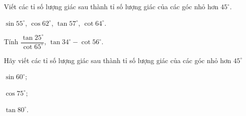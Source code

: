 \begin{bt}
	\begin{listEX}
	\item Viết các tỉ số lượng giác sau thành tỉ số lượng giác của các góc nhỏ hơn $45^\circ$.
	\begin{center} 
	$\sin 55^\circ$, $\cos 62^\circ$, $\tan 57^\circ$, $\cot 64^\circ$.
	\end{center}
	\item Tính $\dfrac{\tan25^\circ}{\cot 65^\circ}$, $\tan 34^\circ - \cot 56^\circ$.
	\end{listEX}
\end{bt}
\begin{bt}
	Hãy viết các tỉ số lượng giác sau thành tỉ số lượng giác của các góc nhỏ hơn $45^\circ$
	\begin{enumEX}{3}
	\item $\sin 60^\circ$;
	\item $\cos 75^\circ$;
	\item $\tan 80^\circ$.
	\end{enumEX}
\end{bt}
